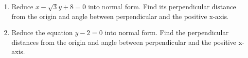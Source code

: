 \begin{enumerate}[label=\thechapter.\arabic*,ref=\thechapter.\theenumi]

\item Reduce $x-\sqrt{3}y+8=0$ into normal form. Find its perpendicular distance from the origin and angle between perpendicular and the positive x-axis. 
\\
\solution 
\label{11/10/3/3/1/lagmul}

\item Reduce the equation $y-2=0$ into normal form. Find the perpendicular distances from the origin and angle between perpendicular and the positive x-axis.
\\
\solution 
\label{11/10/3/3/2/lagmul}


\end{enumerate}
